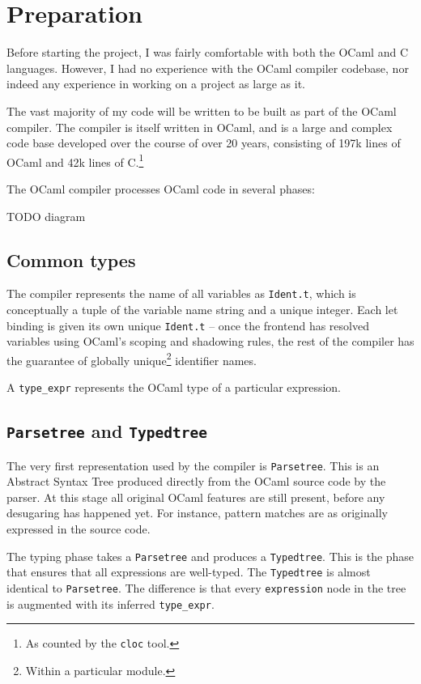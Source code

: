\documentclass[12pt,a4paper,twoside,openright]{report}
\begin{document}
\chapter{Preparation}

Before starting the project, I was fairly comfortable with both the OCaml and
C languages. However, I had no experience with the OCaml compiler codebase, nor
indeed any experience in working on a project as large as it.

The vast majority of my code will be written to be built as part of the OCaml
compiler. The compiler is itself written in OCaml, and is a large and complex
code base developed over the course of over 20 years, consisting of 197k lines
of OCaml and 42k lines of C.\footnote{As counted by the \lstinline!cloc! tool.}

The OCaml compiler processes OCaml code in several phases:

TODO diagram

\section{Common types}\label{common-types}

The compiler represents the name of all variables as \lstinline!Ident.t!, which
is conceptually a tuple of the variable name string and a unique integer. Each
let binding is given its own unique \lstinline!Ident.t! -- once the frontend
has resolved variables using OCaml's scoping and shadowing rules, the rest of
the compiler has the guarantee of globally unique\footnote{Within a particular
module.} identifier names.

A \lstinline!type_expr! represents the OCaml type of a particular expression.

\section{\texttt{Parsetree} and \texttt{Typedtree}}

The very first representation used by the compiler is \lstinline!Parsetree!.
This is an Abstract Syntax Tree produced directly from the OCaml source code by
the parser. At this stage all original OCaml features are still present, before
any desugaring has happened yet. For instance, pattern matches are as
originally expressed in the source code.

The typing phase takes a \lstinline!Parsetree! and produces a
\lstinline!Typedtree!. This is the phase that ensures that all expressions are
well-typed. The \lstinline!Typedtree! is almost identical to
\lstinline!Parsetree!. The difference is that every \lstinline!expression! node
in the tree is augmented with its inferred \lstinline!type_expr!.
\end{document}
